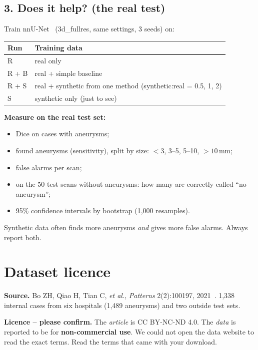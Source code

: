 \documentclass[11pt,a4paper,oneside]{report}
\begin{document}
\section*{3. Does it help? (the real test)}
Train nnU-Net~\cite{isensee2021nnunet} (3d\_fullres, same settings, 3 seeds) on:
\begin{center}
\small
\begin{tabular}{ll}
\toprule
\textbf{Run} & \textbf{Training data} \\
\midrule
R & real only \\
R + B & real + simple baseline \\
R + S & real + synthetic from one method (synthetic:real = 0.5, 1, 2) \\
S & synthetic only (just to see) \\
\bottomrule
\end{tabular}
\end{center}
\textbf{Measure on the real test set:}
\begin{itemize}
  \item Dice on cases with aneurysms;
  \item found aneurysms (sensitivity), split by size: $<3$, 3--5, 5--10, $>10$\,mm;
  \item false alarms per scan;
  \item on the 50 test scans without aneurysms: how many are correctly called ``no aneurysm'';
  \item 95\% confidence intervals by bootstrap (1{,}000 resamples).
\end{itemize}
\begin{caution}
Synthetic data often finds more aneurysms \emph{and} gives more false alarms. Always report both.
\end{caution}

\chapter{Dataset licence}\label{ch:licence}

\textbf{Source.} Bo ZH, Qiao H, Tian C, \emph{et al.}, \emph{Patterns} 2(2):100197, 2021~\cite{bo2021}. 1{,}338 internal cases from six hospitals (1{,}489 aneurysms) and two outside test sets.

\textbf{Licence -- please confirm.} The \emph{article} is CC BY-NC-ND 4.0. The \emph{data} is reported to be for \textbf{non-commercial use}. We could not open the data website to read the exact terms. Read the terms that came with your download.
\end{document}
